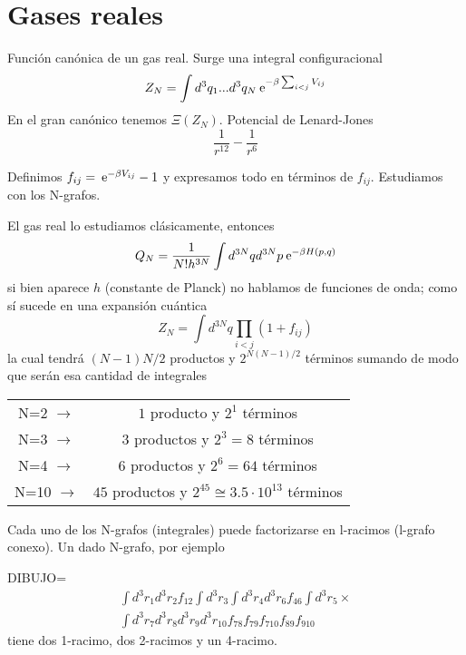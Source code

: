 \documentclass[10pt,oneside]{CBFT_book}
\begin{document}
\section{Gases reales}

Función canónica de un gas real. Surge una integral configuracional
\[
	Z_N =  \int d^3q_1 ... d^3q_N \:\mathrm{e}^{ - \beta \sum_{i<j} V_{ij} }
\]
En el gran canónico tenemos $ \Xi( Z_N ) $. Potencial de Lenard-Jones
\[
	\frac{1}{r^{12}} - \frac{1}{r^{6}}
\]

Definimos $ f_{ij} = \:\mathrm{e}^{-\beta V_{ij}} - 1 $ y expresamos todo en términos de $ f_{ij} $.
Estudiamos con los N-grafos.

El gas real lo estudiamos clásicamente, entonces 
\[
	Q_N = \frac{1}{N! h^{3N} } \int  d^{3N}q d^{3N}p  \:\mathrm{e}^{ - \beta H(p,q) }
\]
si bien aparece $h$ (constante de Planck) no hablamos de funciones de onda; como sí sucede en una
expansión cuántica 
\[
	Z_N = \int  d^{3N}q \prod_{i<j} ( 1 + f_{ij} )
\]
la cual tendrá $ (N-1)N/2 $ productos y $ 2^{N(N-1)/2} $ términos sumando de modo que serán esa cantidad
de integrales
\begin{center}
\begin{tabular}{cc}
N=2 $ \to $ & $1$ producto y $2^1$ términos \\
N=3 $ \to $ & $3$ productos y $2^3=8$ términos \\
N=4 $ \to $ & $6$ productos y $2^6=64$ términos \\
N=10 $ \to $ & $45$ productos y $2^{45} \cong 3.5\cdot 10^{13}$ términos 
\end{tabular}
\end{center}

Cada uno de los N-grafos (integrales) puede factorizarse en l-racimos (l-grafo conexo).
Un dado N-grafo, por ejemplo

DIBUJO=
\begin{multline*}
	\int d^3r_1 d^3r_2 f_{12} \int d^3r_3  \int d^3r_4 d^3r_6 f_{46} \int d^3r_5 \times  \\
	\int d^3r_7 d^3r_8 d^3r_9 d^3r_{10} f_{78} f_{79} f_{710} f_{89} f_{910} 
\end{multline*}
tiene dos 1-racimo, dos 2-racimos y un 4-racimo.
\end{document}
